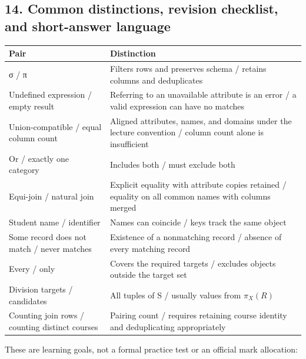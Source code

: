 \subsection{14. Common distinctions, revision checklist, and short-answer language}\label{05_relational_algebra_en-common-distinctions-revision-checklist-and-short-answer-language}

\begin{longtable}[]{@{}
  >{\raggedright\arraybackslash}p{}
  >{\raggedright\arraybackslash}p{}@{}}
\toprule\noalign{}
\begin{minipage}[b]{\linewidth}\raggedright
Pair
\end{minipage} & \begin{minipage}[b]{\linewidth}\raggedright
Distinction
\end{minipage} \\
\midrule\noalign{}
\endhead
\bottomrule\noalign{}
\endlastfoot
σ / π & Filters rows and preserves schema / retains columns and deduplicates \\
Undefined expression / empty result & Referring to an unavailable attribute is an error / a valid expression can have no matches \\
Union-compatible / equal column count & Aligned attributes, names, and domains under the lecture convention / column count alone is insufficient \\
Or / exactly one category & Includes both / must exclude both \\
Equi-join / natural join & Explicit equality with attribute copies retained / equality on all common names with columns merged \\
Student name / identifier & Names can coincide / keys track the same object \\
Some record does not match / never matches & Existence of a nonmatching record / absence of every matching record \\
Every / only & Covers the required targets / excludes objects outside the target set \\
Division targets / candidates & All tuples of S / usually values from \(\pi _{X}(R)\) \\
Counting join rows / counting distinct courses & Pairing count / requires retaining course identity and deduplicating appropriately \\
\end{longtable}

These are learning goals, not a formal practice test or an official mark allocation:

